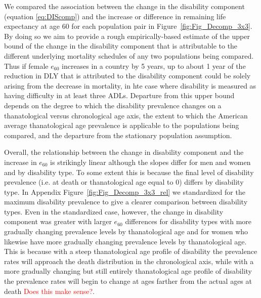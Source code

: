 \documentclass[11pt,oneside,a4paper]{article} %
\begin{document}
We compared the association between the change in the disability component (equation \ref{eq:DIScomp}) and the increase or difference in remaining life expectancy at age 60 for each population pair in Figure~\ref{fig:Fig_Decomp_3x3}. By doing so we aim to provide a rough empirically-based estimate of the upper bound of the change in the disability component that is attributable to the different underlying mortality schedules of any two populations being compared. Thus if female $e_{60}$ increases in a country by 5 years, up to about 1 year of the reduction in DLY that is attributed to the disability component could be solely arising from the decrease in mortality, in hte case where disability is measured as having difficulty in at least three ADLs. Departure from this upper bound depends on the degree to which the disability prevalence changes on a thanatological versus chronological age axis, the extent to which the American average thanatological age prevalence is applicable to the populations being compared, and the departure from the stationary population assumption.

Overall, the relationship between the change in disability component and the increase in $e_{60}$ is strikingly linear although the slopes differ for men and women and by disability type. To some extent this is because the final level of disability prevalence (i.e. at death or thanatological age equal to 0) differs by disability type. In Appendix Figure~\ref{fig:Fig_Decomp_3x3_rel} we standardized for the maximum disability prevalence to give a clearer comparison between disability types. Even in the standardized case, however, the change in disability component was greater with larger $e_{60}$ differences for disability types with more gradually changing prevalence levels by thanatological age and for women who likewise have more gradually changing prevalence levels by thanatological age. This is because with a steep thanatological age profile of disability the prevalence rates will approach the death distribution in the chronological axis, while with a more gradually changing but still entirely thanatological age profile of disability the prevalence rates will begin to change at ages farther from the actual ages at death \textcolor{red}{Does this make sense?}.
\end{document}
